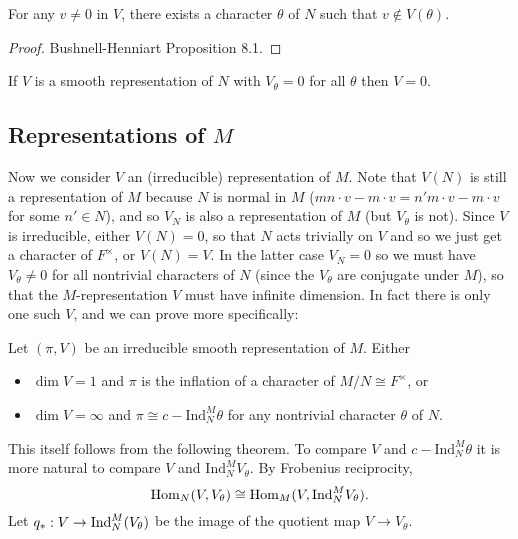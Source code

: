 \begin{prop}
    For any $v \neq 0$ in $V$, there exists a character $\theta$ of $N$ such that $v \not\in V(\theta)$.
\end{prop}
\begin{proof}
    Bushnell-Henniart Proposition 8.1.
\end{proof}

\begin{cor}
    If $V$ is a smooth representation of $N$ with $V_\theta=0$ for all $\theta$ then $V=0$.
\end{cor}


\subsection{Representations of $M$}

Now we consider $V$ an (irreducible) representation of $M$. Note that $V(N)$ is still a representation of $M$ because $N$ is normal in $M$ ($mn\cdot v - m\cdot v = n'm\cdot v - m\cdot v$ for some $n' \in N$), and so $V_N$ is also a representation of $M$ (but $V_\theta$ is not). Since $V$ is irreducible, either $V(N)=0$, so that $N$ acts trivially on $V$ and so we just get a character of $F^\times$, or $V(N)=V$. In the latter case $V_N=0$ so we must have $V_\theta \neq 0$ for all nontrivial characters of $N$ (since the $V_\theta$ are conjugate under $M$), so that the $M$-representation $V$ must have infinite dimension. In fact there is only one such $V$, and we can prove more specifically:

\begin{thm}\label{inf dim}
    Let $(\pi,V)$ be an irreducible smooth representation of $M$. Either 
    \begin{itemize}
        \item $\dim V=1$ and $\pi$ is the inflation of a character of $M/N \cong F^\times$, or
        \item $\dim V = \infty$ and $\pi \cong c-\mathrm{Ind}_N^M \theta$ for any nontrivial character $\theta$ of $N$.
    \end{itemize}
\end{thm}

This itself follows from the following theorem. To compare $V$ and $c-\mathrm{Ind}_N^M \theta$ it is more natural to compare $V$ and $\mathrm{Ind}_N^M V_\theta$. By Frobenius reciprocity,
$$\mathrm{Hom}_N(V,V_\theta) \cong \mathrm{Hom}_M(V,\mathrm{Ind}_N^M V_\theta).$$
Let $q_*: V \to \mathrm{Ind}_N^M(V_\theta)$ be the image of the quotient map $V \to V_\theta$.

